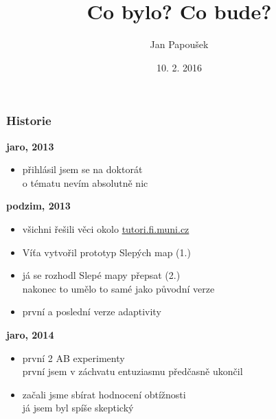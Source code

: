 \documentclass[xcolor=svgnames]{beamer}
\title{Co bylo? Co bude?}
\author{Jan Papoušek}
\institute{Fakulta informatiky Masarykovy univerzity}      %
\date{10. 2. 2016}
\begin{document}
\frame[plain]{\titlepage}
\begin{frame}
	\frametitle{Historie}
	\textbf{jaro, 2013}
		\begin{itemize}
			\item přihlásil jsem se na doktorát\\
				{\tiny o tématu nevím absolutně nic}
		\end{itemize}
	\pause
	\textbf{podzim, 2013}
		\begin{itemize}
			\item všichni řešili věci okolo \url{tutori.fi.muni.cz}
			\item Víťa vytvořil prototyp Slepých map (1.)
			\item já se rozhodl Slepé mapy přepsat (2.)\\
				{\tiny nakonec to umělo to samé jako původní verze}
			\item první a poslední verze adaptivity
		\end{itemize}
	\pause
	\textbf{jaro, 2014}
		\begin{itemize}
			\item první 2 AB experimenty\\
				{\tiny první jsem v záchvatu entuziasmu předčasně ukončil}
			\item začali jsme sbírat hodnocení obtížnosti\\
				{\tiny já jsem byl spíše skeptický}
		\end{itemize}
\end{frame}
\end{document}
